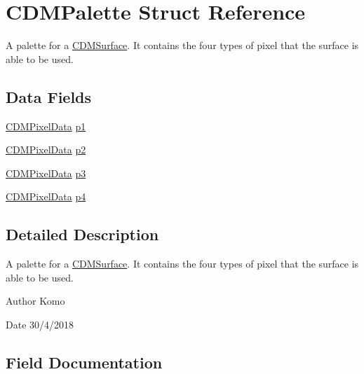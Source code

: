 \hypertarget{struct_c_d_m_palette}{}\section{C\+D\+M\+Palette Struct Reference}
\label{struct_c_d_m_palette}


A palette for a \mbox{\hyperlink{struct_c_d_m_surface}{C\+D\+M\+Surface}}. It contains the four types of pixel that the surface is able to be used.  


\subsection*{Data Fields}
\begin{DoxyCompactItemize}
\item 
\mbox{\hyperlink{struct_c_d_m_pixel_data}{C\+D\+M\+Pixel\+Data}} \mbox{\hyperlink{struct_c_d_m_palette_a4c6a2fedfe750c80560e5d5feefeda3e}{p1}}
\item 
\mbox{\hyperlink{struct_c_d_m_pixel_data}{C\+D\+M\+Pixel\+Data}} \mbox{\hyperlink{struct_c_d_m_palette_ad828960ecdb97b6e8114d18a582aa11a}{p2}}
\item 
\mbox{\hyperlink{struct_c_d_m_pixel_data}{C\+D\+M\+Pixel\+Data}} \mbox{\hyperlink{struct_c_d_m_palette_aa5ac82bfe8c92455fff7acade0e2c9e2}{p3}}
\item 
\mbox{\hyperlink{struct_c_d_m_pixel_data}{C\+D\+M\+Pixel\+Data}} \mbox{\hyperlink{struct_c_d_m_palette_a620eb7d7a1ee6208029f4e024fb297f8}{p4}}
\end{DoxyCompactItemize}


\subsection{Detailed Description}
A palette for a \mbox{\hyperlink{struct_c_d_m_surface}{C\+D\+M\+Surface}}. It contains the four types of pixel that the surface is able to be used. 

\begin{DoxyAuthor}{Author}
Komo 
\end{DoxyAuthor}
\begin{DoxyDate}{Date}
30/4/2018 
\end{DoxyDate}


\subsection{Field Documentation}
\mbox{\label{struct_c_d_m_palette_a4c6a2fedfe750c80560e5d5feefeda3e}} 
